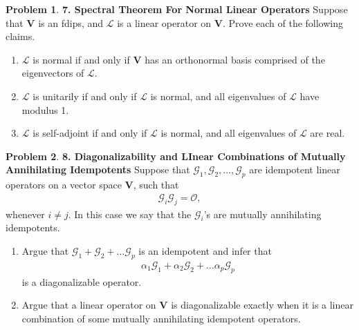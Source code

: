 \documentclass{book}
\theoremstyle{definition}
\newtheorem*{prob*}{Problem}
\newcommand{\G}{\mathcal{G}}
\newcommand{\V}{\mathbf{V}}
\newcommand{\lag}{\mathcal{L}}
\begin{document}
\begin{prob*}\textbf{7. Spectral Theorem For Normal Linear Operators} 
	Suppose that $\V$ is an fdips, and $\lag$ is a linear operator on $\V$. Prove each of the following claims.
	\begin{enumerate}
		\item $\lag$ is normal if and only if $\V$ has an orthonormal basis comprised of the eigenvectors of $\lag$. 
		\item $\lag$ is unitarily if and only if $\lag$ is normal, and all eigenvalues of $\lag$ have modulus 1. 
		\item $\lag$ is self-adjoint if and only if $\lag$ is normal, and all eigenvalues of $\lag$ are real. 
	\end{enumerate}
\end{prob*}









\newpage















\begin{prob*}\textbf{8. Diagonalizability and LInear Combinations of Mutually Annihilating Idempotents}
	Suppose that $\G_1, \G_2, \dots,\G_p$ are idempotent linear operators on a vector space $\V$, such that
	\begin{align*}
	\G_i \G_j = \mathcal{O},
	\end{align*}
	whenever $i\neq j$. In this case we say that the $\G_i$'s are mutually annihilating idempotents. 
	\begin{enumerate}
		\item Argue that $\G_1 + \G_2 + \dots \G_p$ is an idempotent and infer that 
		\begin{align*}
		\alpha_1 \G_1 + \alpha_2 \G_2 + \dots \alpha_p\G_p 
		\end{align*}
		is a diagonalizable operator. 
		
		
		\item Argue that a linear operator on $\V$ is diagonalizable exactly when it is a linear combination of some mutually annihilating idempotent operators. 
		
		
	\end{enumerate}
	
\end{prob*}
\end{document}
